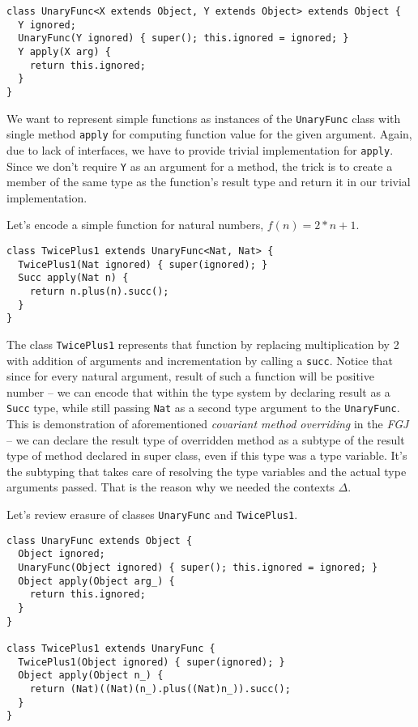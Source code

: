 \documentclass{article}[12pt]
\begin{document}
\begin{verbatim}
class UnaryFunc<X extends Object, Y extends Object> extends Object {
  Y ignored;
  UnaryFunc(Y ignored) { super(); this.ignored = ignored; }
  Y apply(X arg) {
    return this.ignored;
  }
}
\end{verbatim}

We want to represent simple functions as instances of the
\texttt{UnaryFunc} class with single method \texttt{apply} for
computing function value for the given argument. Again, due to lack
of interfaces, we have to provide trivial implementation for
\texttt{apply}. Since we don't require \texttt{Y} as an argument
for a method, the trick is to create a member of the same type as
the function's result type and return it in our trivial implementation.

Let's encode a simple function for natural numbers, $f(n) = 2 * n + 1$.

\begin{verbatim}
class TwicePlus1 extends UnaryFunc<Nat, Nat> {
  TwicePlus1(Nat ignored) { super(ignored); }
  Succ apply(Nat n) {
    return n.plus(n).succ();
  }
}
\end{verbatim}

The class \texttt{TwicePlus1} represents that function by replacing
multiplication by 2 with addition of arguments and incrementation
by calling a \texttt{succ}. Notice that since for every natural argument,
result of such a function will be positive number -- we can encode that
within the type system by declaring result as a \texttt{Succ} type,
while still passing \texttt{Nat} as a second type argument to
the \texttt{UnaryFunc}. This is demonstration of aforementioned
\emph{covariant method overriding} in the \emph{FGJ} -- we can declare
the result type of overridden method as a subtype of the result type
of method declared in super class, even if this type was a
type variable. It's the subtyping that takes care of resolving
the type variables and the actual type arguments passed.
That is the reason why we needed the contexts $\Delta$.

Let's review erasure of classes \texttt{UnaryFunc} and
\texttt{TwicePlus1}.

\begin{verbatim}
class UnaryFunc extends Object {
  Object ignored;
  UnaryFunc(Object ignored) { super(); this.ignored = ignored; }
  Object apply(Object arg_) {
    return this.ignored;
  }
}

class TwicePlus1 extends UnaryFunc {
  TwicePlus1(Object ignored) { super(ignored); }
  Object apply(Object n_) {
    return (Nat)((Nat)(n_).plus((Nat)n_)).succ();
  }
}
\end{verbatim}
\end{document}

